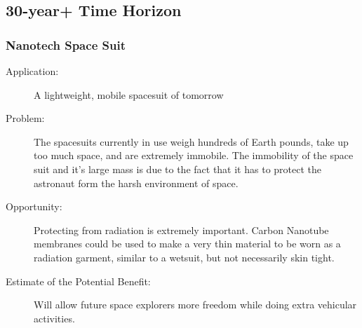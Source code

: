 \subsection{30-year+ Time Horizon}

\subsubsection{Nanotech  Space Suit } 
\label{nano-suit}
\begin{description}  \item[Application:] A lightweight, mobile spacesuit of tomorrow
 
\item[Problem:] The spacesuits  currently in use weigh hundreds of Earth pounds, take up too much space,  and are extremely immobile. The immobility of the space suit and it's  large mass is due to the fact that it has to protect the astronaut form  the harsh environment of space. 
 
\item[Opportunity:] Protecting  from radiation is extremely important. Carbon Nanotube membranes could  be used to make a very thin material to be worn as a radiation garment,  similar to a wetsuit, but not necessarily skin tight. 
 
\item[Estimate of the Potential  Benefit:]Will allow future space explorers more freedom while doing  extra vehicular activities.
\end{description}

 
